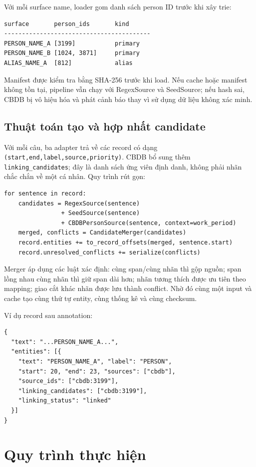 \documentclass[11pt,a4paper]{article}
\begin{document}
Với mỗi surface name, loader gom danh sách person ID trước khi xây trie:

\begin{verbatim}
surface       person_ids       kind
-----------------------------------------
PERSON_NAME_A [3199]           primary
PERSON_NAME_B [1024, 3871]     primary
ALIAS_NAME_A  [812]            alias
\end{verbatim}

Manifest được kiểm tra bằng SHA-256 trước khi load. Nếu cache hoặc manifest
không tồn tại, pipeline vẫn chạy với RegexSource và SeedSource; nếu hash sai,
CBDB bị vô hiệu hóa và phát cảnh báo thay vì sử dụng dữ liệu không xác minh.

\subsection{Thuật toán tạo và hợp nhất candidate}

Với mỗi câu, ba adapter trả về các record có dạng
\texttt{(start,end,label,source,priority)}. CBDB bổ sung thêm
\texttt{linking\_candidates}; đây là danh sách ứng viên định danh, không phải
nhãn chắc chắn về một cá nhân. Quy trình rút gọn:

\begin{verbatim}
for sentence in record:
    candidates = RegexSource(sentence)
                + SeedSource(sentence)
                + CBDBPersonSource(sentence, context=work_period)
    merged, conflicts = CandidateMerger(candidates)
    record.entities += to_record_offsets(merged, sentence.start)
    record.unresolved_conflicts += serialize(conflicts)
\end{verbatim}

Merger áp dụng các luật xác định: cùng span/cùng nhãn thì gộp nguồn; span lồng
nhau cùng nhãn thì giữ span dài hơn; nhãn tương thích được ưu tiên theo mapping;
giao cắt khác nhãn được lưu thành conflict. Nhờ đó cùng một input và cache tạo
cùng thứ tự entity, cùng thống kê và cùng checksum.

Ví dụ record sau annotation:

\begin{verbatim}
{
  "text": "...PERSON_NAME_A...",
  "entities": [{
    "text": "PERSON_NAME_A", "label": "PERSON",
    "start": 20, "end": 23, "sources": ["cbdb"],
    "source_ids": ["cbdb:3199"],
    "linking_candidates": ["cbdb:3199"],
    "linking_status": "linked"
  }]
}
\end{verbatim}

\section{Quy trình thực hiện}
\end{document}
